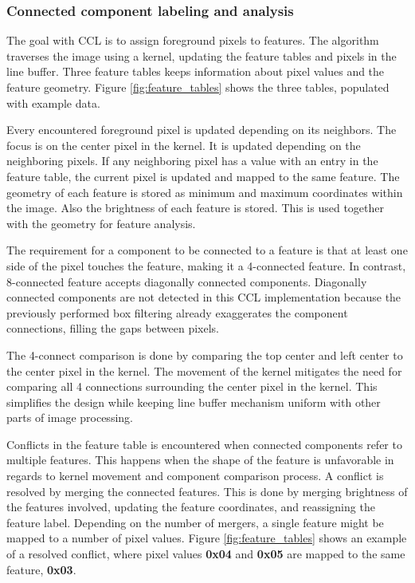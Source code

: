 \documentclass[12pt]{report}
\begin{document}
\subsubsection{Connected component labeling and analysis}
The goal with CCL is to assign foreground pixels to features. The algorithm traverses the image using a kernel, updating the feature tables and pixels in the line buffer. Three feature tables keeps information about pixel values and the feature geometry. Figure \ref*{fig:feature_tables} shows the three tables, populated with example data. 
\par
Every encountered foreground pixel is updated depending on its neighbors. The focus is on the center pixel in the kernel. It is updated depending on the neighboring pixels. If any neighboring pixel has a value with an entry in the feature table, the current pixel is updated and mapped to the same feature. The geometry of each feature is stored as minimum and maximum coordinates within the image. Also the brightness of each feature is stored. This is used together with the geometry for feature analysis.
\par
The requirement for a component to be connected to a feature is that at least one side of the pixel touches the feature, making it a 4-connected feature. In contrast, 8-connected feature accepts diagonally connected components. Diagonally connected components are not detected in this CCL implementation because the previously performed box filtering already exaggerates the component connections, filling the gaps between pixels.
\par
The 4-connect comparison is done by comparing the top center and left center to the center pixel in the kernel. The movement of the kernel mitigates the need for comparing all 4 connections surrounding the center pixel in the kernel. This simplifies the design while keeping line buffer mechanism uniform with other parts of image processing.
\par
Conflicts in the feature table is encountered when connected components refer to multiple features. This happens when the shape of the feature is unfavorable in regards to kernel movement and component comparison process. A conflict is resolved by merging the connected features. This is done by merging brightness of the features involved, updating the feature coordinates, and reassigning the feature label. Depending on the number of mergers, a single feature might be mapped to a number of pixel values. Figure \ref*{fig:feature_tables} shows an example of a resolved conflict, where pixel values \textbf{0x04} and \textbf{0x05} are mapped to the same feature, \textbf{0x03}.
\end{document}
